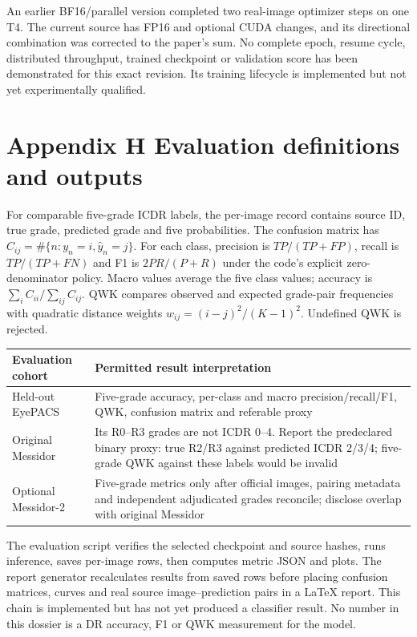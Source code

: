 An earlier BF16/parallel version completed two real-image optimizer steps
on one T4. The current source has FP16 and optional CUDA changes, and its
directional combination was corrected to the paper's sum. No complete
epoch, resume cycle, distributed throughput, trained checkpoint or
validation score has been demonstrated for this exact revision. Its
training lifecycle is implemented but not yet experimentally qualified.

\newpage
\section*{\color{ink}Appendix H \quad Evaluation definitions and outputs}
For comparable five-grade ICDR labels, the per-image record contains
source ID, true grade, predicted grade and five probabilities. The
confusion matrix has $C_{ij}=\#\{n:y_n=i,\hat y_n=j\}$. For each class,
precision is $TP/(TP+FP)$, recall is $TP/(TP+FN)$ and F1 is
$2PR/(P+R)$ under the code's explicit zero-denominator policy. Macro
values average the five class values; accuracy is
$\sum_i C_{ii}/\sum_{ij}C_{ij}$. QWK compares observed and expected
grade-pair frequencies with quadratic distance weights
$w_{ij}=(i-j)^2/(K-1)^2$. Undefined QWK is rejected.

\small
\begin{tabularx}{\linewidth}{@{}p{.25\linewidth}Y@{}}
\toprule
Evaluation cohort & Permitted result interpretation\\
\midrule
Held-out EyePACS & Five-grade accuracy, per-class and macro
precision/recall/F1, QWK, confusion matrix and referable proxy\\
Original Messidor & Its R0--R3 grades are not ICDR 0--4. Report the
predeclared binary proxy: true R2/R3 against predicted ICDR 2/3/4;
five-grade QWK against these labels would be invalid\\
Optional Messidor-2 & Five-grade metrics only after official images,
pairing metadata and independent adjudicated grades reconcile; disclose
overlap with original Messidor\\
\bottomrule
\end{tabularx}
\normalsize

The evaluation script verifies the selected checkpoint and source hashes,
runs inference, saves per-image rows, then computes metric JSON and plots.
The report generator recalculates results from saved rows before placing
confusion matrices, curves and real source image--prediction pairs in a
LaTeX report. This chain is implemented but has not yet produced a
classifier result. No number in this dossier is a DR accuracy, F1 or QWK
measurement for the model.

